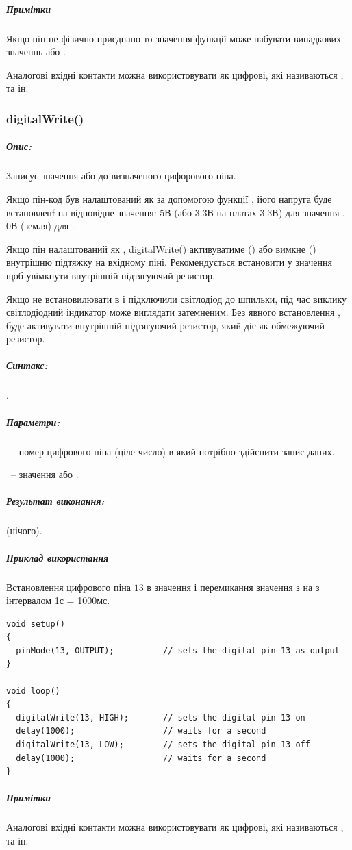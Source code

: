 \documentclass[12pt,a4paper]{report}  %
\begin{document}
\subparagraph{Примітки}

Якщо пін не фізично приєднано то значення функції  може набувати випадкових значеннь  або .

Аналогові вхідні контакти можна використовувати як цифрові, які називаються ,  та ін.

\subsubsection{digitalWrite()}

\subparagraph{Опис:} Записує значення  або  до визначеного цифорового піна.

Якщо пін-код був налаштований як  за допомогою функції , його напруга буде встановленf на відповідне значення: $5$В (або $3.3$В на платах $3.3$В) для значення , $0$В (земля) для .

Якщо пін налаштований як , digitalWrite() активуватиме () або вимкне () внутрішню підтяжку на вхідному піні. Рекомендується встановити  у значення  щоб увімкнути внутрішній підтягуючий резистор.

Якщо не встановилювати  в  і підключили світлодіод до шпильки, під час виклику  світлодіодний індикатор може виглядати затемненим. Без явного встановлення ,  буде активувати внутрішній підтягуючий резистор, який діє як обмежуючий резистор.

\subparagraph{Синтакс:} .
\subparagraph{Параметри:} ~-- номер цифрового піна (ціле число) в який потрібно здійснити запис даних.

~-- значення  або .
\subparagraph{Результат виконання:}  (нічого).

\subparagraph{Приклад використання}

Встановлення цифрового піна $13$ в значення  і перемикання значення з  на  з інтервалом 1с = 1000мс.

\begin{lstlisting}[label=digitalwrite,caption=Використання функції digitalWrite()]
void setup()
{
  pinMode(13, OUTPUT);          // sets the digital pin 13 as output
}

void loop()
{
  digitalWrite(13, HIGH);       // sets the digital pin 13 on
  delay(1000);                  // waits for a second
  digitalWrite(13, LOW);        // sets the digital pin 13 off
  delay(1000);                  // waits for a second
}
\end{lstlisting}
\subparagraph{Примітки} Аналогові вхідні контакти можна використовувати як цифрові, які називаються ,  та ін.
\end{document}
